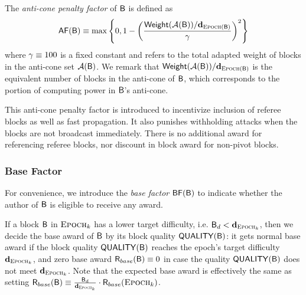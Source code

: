 The \emph{anti-cone penalty factor} of $\textsf{B}$ is defined as
\begin{align}
	\mathsf{AF}(\textsf{B}) \equiv \max{\left \{{0, 1-\left(\frac{ \ensuremath{\mathsf{Weight}}(\ensuremath{\mathcal{A}}(\textsf{B}))/\mathbf{d}_{\ensuremath{\textsc{Epoch}}(\textsf{B})}
	}{\gamma}\right)^2} \right \}}
\end{align}
where $\gamma\equiv {{100}}$ is a fixed constant and 
 refers to the total {adapted weight} of blocks in the anti-cone set $\mathcal{A}(\textsf{B})$.
We remark that $\mathsf{Weight}(\mathcal{A}(\textsf{B}))/\mathbf{d}_{\textsc{Epoch}(\textsf{B})}$ is the equivalent number of blocks in the anti-cone of $\textsf{B}$, which corresponds to the portion of computing power in $\textsf{B}$'s anti-cone.

This anti-cone penalty factor is introduced to incentivize inclusion of {referee} blocks as well as fast propagation.
It also punishes withholding attacks when the blocks are not broadcast immediately. 
There is no additional award for referencing {referee} blocks, nor discount in block award for  non-pivot blocks.


\subsubsection{Base Factor}
\label{sec:discount}

For convenience, we introduce the \emph{base factor} $\mathsf{BF}(\textsf{B})$ to indicate whether the author of $\textsf{B}$ is eligible to receive any award.

If a block $\textsf{B}$ in $\textsc{Epoch}_k$ has a lower target difficulty, i.e. $\textsf{B}_d<\mathbf{d}_{\textsc{Epoch}_k}$,
then we decide the base award of $\textsf{B}$ by its 
block quality $\mathsf{QUALITY}(\textsf{B})$:
it gets normal base award if 
the block quality $\mathsf{QUALITY}(\textsf{B})$ 
reaches the epoch's target difficulty $\mathbf{d}_{\textsc{Epoch}_k}$, and zero base award $\textsf{R}_{base}(\textsf{B})\equiv 0$ in case the 
quality $\mathsf{QUALITY}(\textsf{B})$ does not meet $\mathbf{d}_{\textsc{Epoch}_k}$.
Note that the expected base award is effectively the same as setting $\textsf{R}_{base}(\textsf{B})\equiv\frac{\textsf{B}_d}{\mathbf{d}_{\textsc{Epoch}_k}} \cdot \textsf{R}_{base}(\textsc{Epoch}_k)$.


